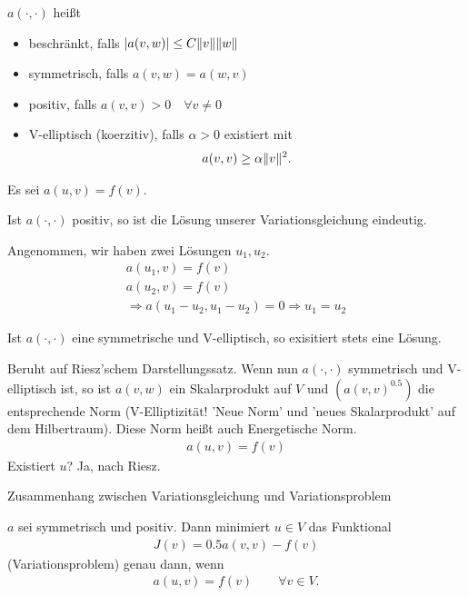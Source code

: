\begin{definition}
  $a(\cdot, \cdot)$ heißt
  \begin{itemize}
  \item beschränkt, falls $|a(v, w)|\leq C \|v\| \|w\|$
  \item symmetrisch, falls $a(v, w) = a(w, v)$
  \item positiv, falls $a(v, v) > 0 \quad \forall v \neq 0$
  \item V-elliptisch (koerzitiv), falls $\alpha > 0$ existiert mit
    \begin{align*}
      a(v, v) \geq \alpha \|v\|^2.
    \end{align*}
  \end{itemize}
\end{definition}
Es sei $a(u,v) = f(v)$.
\begin{satz}
  Ist $a(\cdot, \cdot)$ positiv, so ist die Lösung unserer Variationsgleichung eindeutig.
\end{satz}
\begin{beweis}
  Angenommen, wir haben zwei Lösungen $u_1, u_2$.
  \begin{align*}
    a(u_1, v) = f(v)\\
    a(u_2, v) = f(v)\\
\Rightarrow a(u_1 - u_2, u_1 - u_2) = 0  \Rightarrow u_1 = u_2
  \end{align*}
\end{beweis}
\begin{satz}
  Ist $a(\cdot, \cdot)$ eine symmetrische und V-elliptisch, so exisitiert stets eine Lösung.  
\end{satz}
\begin{beweis}
  Beruht auf Riesz'schem Darstellungssatz. Wenn nun $a(\cdot, \cdot)$ symmetrisch und V-elliptisch ist, so ist $a(v, w)$ ein Skalarprodukt auf $V$ und $(a(v,v)^{0.5}) $ die entsprechende Norm (V-Elliptizität! 'Neue Norm' und 'neues Skalarprodukt' auf dem Hilbertraum). Diese Norm heißt auch Energetische Norm. 
  \begin{align*}
    a(u,v) = f(v)
  \end{align*}
Existiert $u$? Ja, nach Riesz. 
\end{beweis}
\begin{lemma} Zusammenhang zwischen Variationsgleichung und Variationsproblem 
  
$a$ sei symmetrisch und positiv. Dann minimiert $u \in V$ das Funktional
\begin{align*}
  J(v) = 0.5 a(v,v) -f(v)
\end{align*}
(Variationsproblem) genau dann, wenn
\begin{align*}
  a(u,v) = f(v) \qquad \forall v \in V.
\end{align*}
\end{lemma}
